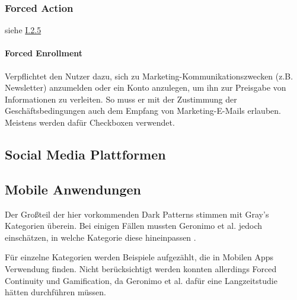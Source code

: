 \documentclass[a4paper]{article}
\newcommand{\todo}[1]{{\color{purple}{#1}}}
\begin{document}
\subsubsection{Forced Action}
\label{sssec:forced_action2}
siehe \hyperref[sssec:forced_action]{I.2.5}

\paragraph{Forced Enrollment}
\label{para:forced_enrollment}
Verpflichtet den Nutzer dazu, sich zu Marketing-Kommunikationszwecken (z.B. Newsletter) anzumelden oder ein Konto anzulegen, um ihn zur Preisgabe von Informationen zu verleiten. So muss er mit der Zustimmung der Geschäftsbedingungen auch dem Empfang von Marketing-E-Mails erlauben. Meistens werden dafür Checkboxen verwendet.

\subsection{Social Media Plattformen}
\label{sub:soziale_netzwerke}
\todo{Text hinzufügen}

\subsection{Mobile Anwendungen}
\label{sub:mobile_anwendungen}
Der Großteil der hier vorkommenden Dark Patterns stimmen mit Gray's Kategorien überein. Bei einigen Fällen mussten Geronimo et al. jedoch einschätzen, in welche Kategorie diese hineinpassen \cite{geronimo}.

Für einzelne Kategorien werden Beispiele aufgezählt, die in Mobilen Apps Verwendung finden. Nicht berücksichtigt werden konnten allerdings Forced Continuity und Gamification, da Geronimo et al. dafür eine Langzeitstudie hätten durchführen müssen.\newline

\todo{Tabelle mit UI-Beispielen hinzufügen}
\end{document}
